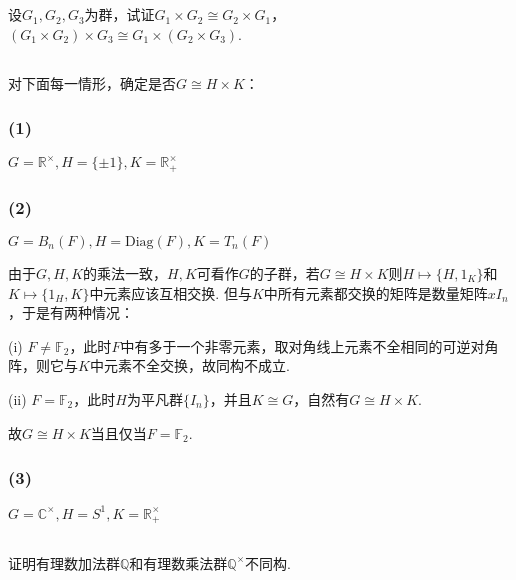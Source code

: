 \subsection{}
设$G_1, G_2, G_3$为群，试证$G_1\times G_2\cong G_2\times G_1$，
$(G_1\times G_2)\times G_3\cong G_1\times(G_2\times G_3)$.

\Proofbyintimidation

\subsection{}
对下面每一情形，确定是否$G\cong H\times K$：
\subsubsection{(1)}
$G=\mathbb{R}^{\times}, H=\{\pm1\}, K=\mathbb{R}^{\times}_+$

\subsubsection{(2)}
$G=B_n(F), H=\mathrm{Diag}(F), K=T_n(F)$

\jie
由于$G,H,K$的乘法一致，$H,K$可看作$G$的子群，若$G\cong H\times K$则$H\mapsto \{H, 1_K\}$和$K\mapsto \{1_H, K\}$中元素应该互相交换. 但与$K$中所有元素都交换的矩阵是数量矩阵$xI_n$，于是有两种情况：

(i) $F\neq\mathbb{F}_2$，此时$F$中有多于一个非零元素，取对角线上元素不全相同的可逆对角阵，则它与$K$中元素不全交换，故同构不成立.

(ii) $F=\mathbb{F}_2$，此时$H$为平凡群$\{I_n\}$，并且$K\cong G$，自然有$G\cong H\times K$.

故$G\cong H\times K$当且仅当$F=\mathbb{F}_2$.
\subsubsection{(3)}
$G=\mathbb{C}^{\times}, H=S^1, K=\mathbb{R}^{\times}_+$


\subsection{}
证明有理数加法群$\mathbb{Q}$和有理数乘法群$\mathbb{Q}^{\times}$不同构.


